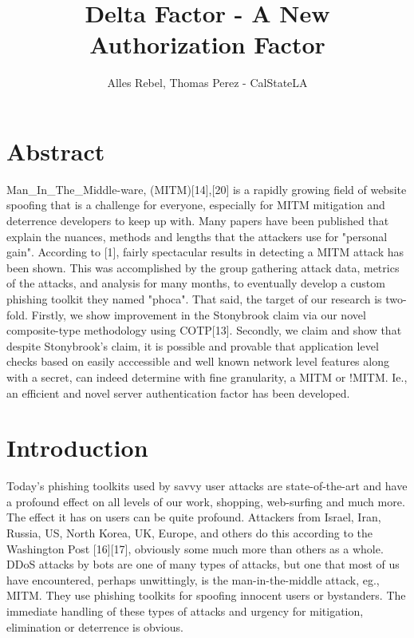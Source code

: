 \documentclass[a4paper, 11pt]{article} 				%
\title{Delta Factor - A New Authorization Factor}
\author{Alles Rebel, Thomas Perez - CalStateLA}
\begin{document}
\maketitle



\section{Abstract}
\setlength{\baselineskip}{1.5\baselineskip}
\noindent
Man\_In\_The\_Middle-ware, (MITM)[14],[20] is a rapidly growing field of website spoofing that is a challenge for everyone, especially for MITM mitigation and deterrence  developers to keep up with. Many papers have been published that explain the nuances, methods and lengths that the attackers use for "personal gain". According to [1], fairly spectacular results in detecting a MITM attack has been shown. This was accomplished by the group gathering attack data, metrics of the attacks, and analysis for many months, to eventually develop a custom phishing toolkit they named "phoca". That said, the target of our research is two-fold. Firstly, we show improvement in the Stonybrook claim via our novel composite-type methodology using COTP[13].  Secondly, we claim and show that despite Stonybrook's claim, it is possible and provable that application level checks based on easily acccessible and well known network level features along with a secret, can indeed determine with fine granularity, a MITM or !MITM. Ie., an efficient and novel server authentication factor has been developed.  



\section{Introduction}
\noindent
Today’s phishing toolkits used by savvy user attacks are state-of-the-art and have a profound effect on all levels of our work, shopping, web-surfing and much more. The effect it has on users can be quite profound. Attackers from Israel, Iran, Russia, US, North Korea, UK, Europe, and others do this according to the Washington Post [16][17], obviously some much more than others as a whole. DDoS attacks by bots are one of many types of attacks, but one that most of us have encountered, perhaps unwittingly, is the  man-in-the-middle attack, eg., MITM. They use phishing toolkits for spoofing innocent users or bystanders. The immediate handling of these types of attacks and urgency for mitigation, elimination or deterrence is obvious. 
\end{document}
